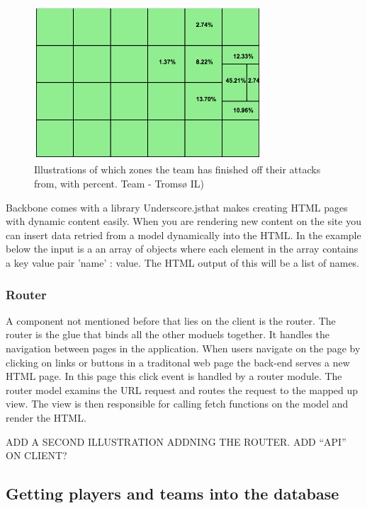 \begin{figure}[ht!]
\centering
\includegraphics[width=85mm]{images/general/finishing_zones.png}
\caption{Illustrations of which zones the team has finished off their attacks from, with percent. Team - Tromsø IL)}
\label{fig:attacking_zones}
\end{figure}

Backbone comes with a library Underscore.js\footnotemark that makes creating HTML pages with dynamic content easily. When you are rendering new content on the site you can insert data retried from a model dynamically into the HTML. In the example below the input is a an array of objects where each element in the array contains a key value pair 'name' : value. The HTML output of this will be a list of names.




\subsubsection{Router}

A component not mentioned before that lies on the client is the router. The router is the glue that binds all the other moduels together. It handles the navigation between pages in the application. When users navigate on the page by clicking on links or buttons in a traditonal web page the back-end serves a new HTML page. In this page this click event is handled by a router module. The router model examins the URL request and routes the request to the mapped up view. The view is then responsible for calling fetch functions on the model and render the HTML.

ADD A SECOND ILLUSTRATION ADDNING THE ROUTER. ADD ``API'' ON CLIENT?

\subsection{Getting players and teams into the database}

